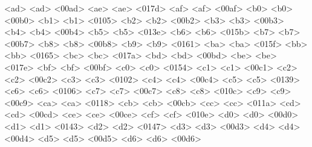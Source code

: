       <ad> <ad> <00ad> %
      <ae> <ae> <017d> %
      <af> <af> <00af> %
      <b0> <b0> <00b0> %
      <b1> <b1> <0105> %
      <b2> <b2> <00b2> %
      <b3> <b3> <00b3> %
      <b4> <b4> <00b4> %
      <b5> <b5> <013e> %
      <b6> <b6> <015b> %
      <b7> <b7> <00b7> %
      <b8> <b8> <00b8> %
      <b9> <b9> <0161> %
      <ba> <ba> <015f> %
      <bb> <bb> <0165> %
      <bc> <bc> <017a> %
      <bd> <bd> <00bd> %
      <be> <be> <017e> %
      <bf> <bf> <00bf> %
      <c0> <c0> <0154> %
      <c1> <c1> <00c1> %
      <c2> <c2> <00c2> %
      <c3> <c3> <0102> %
      <c4> <c4> <00c4> %
      <c5> <c5> <0139> %
      <c6> <c6> <0106> %
      <c7> <c7> <00c7> %
      <c8> <c8> <010c> %
      <c9> <c9> <00c9> %
      <ca> <ca> <0118> %
      <cb> <cb> <00cb> %
      <cc> <cc> <011a> %
      <cd> <cd> <00cd> %
      <ce> <ce> <00ce> %
      <cf> <cf> <010e> %
      <d0> <d0> <00d0> %
      <d1> <d1> <0143> %
      <d2> <d2> <0147> %
      <d3> <d3> <00d3> %
      <d4> <d4> <00d4> %
      <d5> <d5> <00d5> %
      <d6> <d6> <00d6> %

